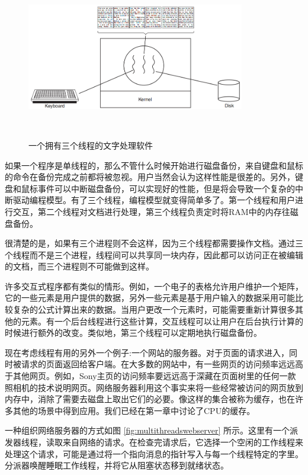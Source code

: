 	\begin{figure}[ht]\small
		\centering
		\includegraphics[width=0.85\textwidth]{FIG/2-7.png}
		\caption{一个拥有三个线程的文字处理软件}　\label{fig:multithreads}
	\end{figure}
	
	如果一个程序是单线程的，那么不管什么时候开始进行磁盘备份，来自键盘和鼠标的命令在备份完成之前都将被忽视。用户当然会认为这样性能是很差的。另外，键盘和鼠标事件可以中断磁盘备份，可以实现好的性能，但是将会导致一个复杂的中断驱动编程模型。有了三个线程，编程模型就变得简单多了。第一个线程和用户进行交互，第二个线程对文档进行处理，第三个线程负责定时将RAM中的内存往磁盘备份。
	
	很清楚的是，如果有三个进程则不会这样，因为三个线程都需要操作文档。通过三个线程而不是三个进程，线程间可以共享同一块内存，因此都可以访问正在被编辑的文档，而三个进程则不可能做到这样。
	
	许多交互式程序都有类似的情形。例如，一个电子的表格允许用户维护一个矩阵，它的一些元素是用户提供的数据，另外一些元素是基于用户输入的数据采用可能比较复杂的公式计算出来的数据。当用户更改一个元素时，可能需要重新计算很多其他的元素。有一个后台线程进行这些计算，交互线程可以让用户在后台执行计算的时候进行额外的改变。类似地，第三个线程可以定期地执行磁盘备份。
	
	现在考虑线程有用的另外一个例子:一个网站的服务器。对于页面的请求进入，同时被请求的页面返回给客户端。在大多数的网站中，有一些网页的访问频率远远高于其他网页。例如，Sony主页的访问频率要远远高于深藏在页面树里的任何一款照相机的技术说明网页。网络服务器利用这个事实来将一些经常被访问的网页放到内存中，消除了需要去磁盘上取出它们的必要。像这样的集合被称为缓存，也在许多其他的场景中得到应用。我们已经在第一章中讨论了CPU的缓存。
	
	一种组织网络服务器的方式如图 \ref{fig:multithreadswebserver} 所示。这里有一个派发器线程，读取来自网络的请求。在检查完请求后，它选择一个空闲的工作线程来处理这个请求，可能是通过将一个指向消息的指针写入与每一个线程特定的字里。分派器唤醒睡眠工作线程，并将它从阻塞状态移到就绪状态。
	
